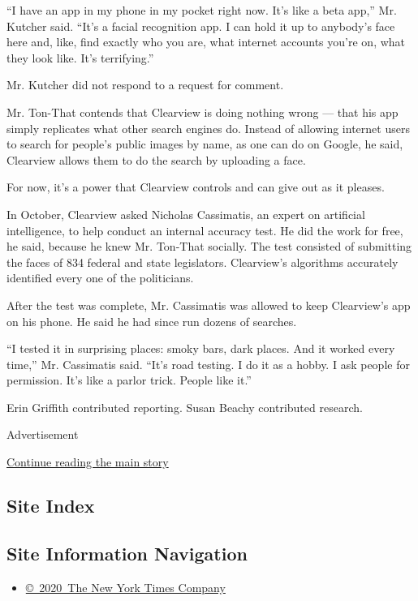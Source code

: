 ``I have an app in my phone in my pocket right now. It's like a beta
app,'' Mr. Kutcher said. ``It's a facial recognition app. I can hold it
up to anybody's face here and, like, find exactly who you are, what
internet accounts you're on, what they look like. It's terrifying.''

Mr. Kutcher did not respond to a request for comment.

Mr. Ton-That contends that Clearview is doing nothing wrong --- that his
app simply replicates what other search engines do. Instead of allowing
internet users to search for people's public images by name, as one can
do on Google, he said, Clearview allows them to do the search by
uploading a face.

For now, it's a power that Clearview controls and can give out as it
pleases.

In October, Clearview asked Nicholas Cassimatis, an expert on artificial
intelligence, to help conduct an internal accuracy test. He did the work
for free, he said, because he knew Mr. Ton-That socially. The test
consisted of submitting the faces of 834 federal and state legislators.
Clearview's algorithms accurately identified every one of the
politicians.

After the test was complete, Mr. Cassimatis was allowed to keep
Clearview's app on his phone. He said he had since run dozens of
searches.

``I tested it in surprising places: smoky bars, dark places. And it
worked every time,'' Mr. Cassimatis said. ``It's road testing. I do it
as a hobby. I ask people for permission. It's like a parlor trick.
People like it.''

Erin Griffith contributed reporting. Susan Beachy contributed research.

Advertisement

\protect\hyperlink{after-bottom}{Continue reading the main story}

\hypertarget{site-index}{%
\subsection{Site Index}\label{site-index}}

\hypertarget{site-information-navigation}{%
\subsection{Site Information
Navigation}\label{site-information-navigation}}

\begin{itemize}
\tightlist
\item
  \href{https://help.nytimes3xbfgragh.onion/hc/en-us/articles/115014792127-Copyright-notice}{©~2020~The
  New York Times Company}
\end{itemize}

